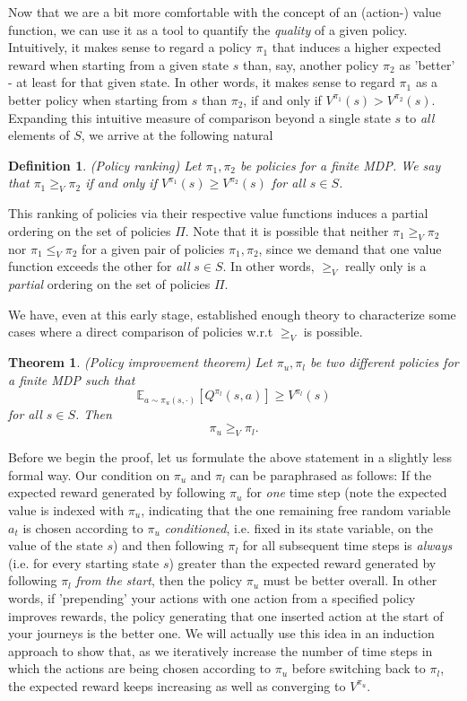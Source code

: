 \documentclass[11pt]{article} %
\newtheorem{thm}{Theorem}
\newtheorem{defn}{Definition}
\begin{document}
Now that we are a bit more comfortable with the concept of an (action-) value function, we can use it as a tool to quantify the \textit{quality} of a given policy. Intuitively, it makes sense to regard a policy $\pi_1$ that induces a higher expected reward when starting from a given state $s$ than, say, another policy $\pi_2$ as 'better'  - at least for that given state. In other words, it makes sense to regard $\pi_1$ as a better policy when starting from $s$ than $\pi_2$, if and only if $V^{\pi_1}(s) > V^{\pi_2}(s)$. Expanding this intuitive measure of comparison beyond a single state $s$ to \textit{all} elements of $S$, we arrive at the following natural

\begin{defn}{(Policy ranking)}
Let $\pi_1, \pi_2$ be policies for a finite MDP. We say that $\pi_1 \ge_V \pi_2$ if and only if $V^{\pi_1}(s) \ge V^{\pi_2}(s)$ for all $s \in S$.
\end{defn}

This ranking of policies via their respective value functions induces a partial ordering on the set of policies $\Pi$. Note that it is possible that neither $\pi_1 \ge_V \pi_2$ nor $\pi_1 \le_V \pi_2$ for a given pair of policies $\pi_1,\pi_2$, since we demand that one value function exceeds the other for \textit{all} $s \in S$. In other words, $\ge_V$ really only is a \textit{partial} ordering on the set of policies $\Pi$.

We have, even at this early stage, established enough theory to characterize some cases where a direct comparison of policies w.r.t $\ge_V$ is possible.

\begin{thm}{(Policy improvement theorem)}
	Let $\pi_u, \pi_l$ be two different policies for a finite MDP such that $$ \mathbb{E}_{a \sim \pi_u(s,\cdot )}[Q^{\pi_l}(s,a)] \ge V^{\pi_l}(s)$$ for all $s \in S$. Then $$\pi_u \ge_V \pi_l.$$
\end{thm}

Before we begin the proof, let us formulate the above statement in a slightly less formal way. Our condition on $\pi_u$ and $\pi_l$ can be paraphrased as follows: If the expected reward generated by following $\pi_u$ for \textit{one} time step (note the expected value is indexed with $\pi_u$, indicating that the one remaining free random variable $a_t$ is chosen according to $\pi_u$ \textit{conditioned}, i.e. fixed in its state variable, on the value of the state $s$) and then following $\pi_l$ for all subsequent time steps is \textit{always} (i.e. for every starting state $s$) greater than the expected reward generated by following $\pi_l$ \textit{from the start}, then the policy $\pi_u$ must be better overall. In other words, if 'prepending' your actions with one action from a specified policy improves rewards, the policy generating that one inserted action at the start of your journeys is the better one. We will actually use this idea in an induction approach to show that, as we iteratively increase the number of time steps in which the actions are being chosen according to $\pi_u$ before switching back to $\pi_l$, the expected reward keeps increasing as well as converging to $V^{\pi_u}$.
\end{document}

